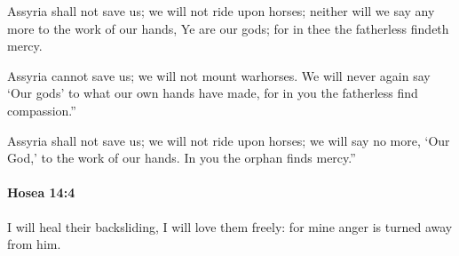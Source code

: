			\begin{versebox}
					\item[BHS] 
					\item[LXX] 
					\item[ASV] Assyria shall not save us; we will not ride upon horses; neither will we say any more to the work of our hands, Ye are our gods; for in thee the fatherless findeth mercy.
					\item[NIV] Assyria cannot save us; we will not mount warhorses. We will never again say ‘Our gods’ to what our own hands have made, for in you the fatherless find compassion.”
					\item[NRSV] Assyria shall not save us; we will not ride upon horses; we will say no more, ‘Our God,’ to the work of our hands. In you the orphan finds mercy.”
			\end{versebox}

		\paragraph{Hosea 14:4} %
			\label{HOSEA-14-4}

			I will heal their backsliding, I will love them freely: for mine anger is turned away from him.

